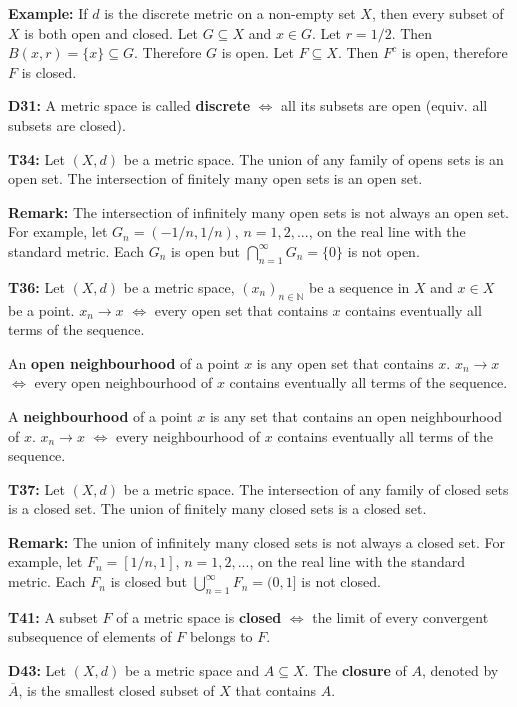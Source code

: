 \documentclass[twocolumn,10pt]{article}
\begin{document}
\color{red}
\textbf{Example:} If $d$ is the discrete metric on a non-empty set $X$, then every subset of $X$ is both open and closed. Let $G\subseteq X$ and $x\in G$. Let $r=1/2$. Then $B(x,r)=\{x\}\subseteq G$. Therefore $G$ is open. Let $F\subseteq X$. Then $F^c$ is open, therefore $F$ is closed.
\color{black}

\textbf{D31:} A metric space is called \textbf{discrete} $\Leftrightarrow$ all its subsets are open (equiv. all subsets are closed).

\textbf{T34:} Let $(X,d)$ be a metric space. The union of any family of opens sets is an open set. The intersection of finitely many open sets is an open set.

\textbf{Remark:} The intersection of infinitely many open sets is not always an open set. \color{red} For example, let $G_n=(-1/n,1/n)$, $n=1,2,...$, on the real line with the standard metric. Each $G_n$ is open but $\bigcap_{n=1}^{\infty}G_n=\{0\}$ is not open.\color{black}

\textbf{T36:} Let $(X,d)$ be a metric space, $(x_n)_{n\in\mathbb{N}}$ be a sequence in $X$ and $x\in X$ be a point. $x_n\to x$ $\Leftrightarrow$ every open set that contains $x$ contains eventually all terms of the sequence.

An \textbf{open neighbourhood} of a point $x$ is any open set that contains $x$. $x_n\to x$ $\Leftrightarrow$ every open neighbourhood of $x$ contains eventually all terms of the sequence.

A \textbf{neighbourhood} of a point $x$ is any set that contains an open neighbourhood of $x$. $x_n\to x$ $\Leftrightarrow$ every neighbourhood of $x$ contains eventually all terms of the sequence.

\textbf{T37:} Let $(X,d)$ be a metric space. The intersection of any family of closed sets is a closed set. The union of finitely many closed sets is a closed set.

\textbf{Remark:} The union of infinitely many closed sets is not always a closed set. \color{red} For example, let $F_n=[1/n,1]$, $n=1,2,...$, on the real line with the standard metric. Each $F_n$ is closed but $\bigcup_{n=1}^{\infty}F_n=(0,1]$ is not closed.\color{black}

\textbf{T41:} A subset $F$ of a metric space is \textbf{closed} $\Leftrightarrow$ the limit of every convergent subsequence of elements of $F$ belongs to $F$.

\textbf{D43:} Let $(X,d)$ be a metric space and $A\subseteq X$. The \textbf{closure} of $A$, denoted by $\overline{A}$, is the smallest closed subset of $X$ that contains $A$.
\end{document}
